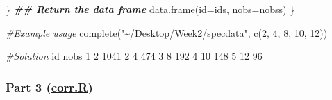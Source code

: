 \documentclass[
]{article}
\newenvironment{Shaded}{\begin{snugshade}}{\end{snugshade}}
\newcommand{\AttributeTok}[1]{\textcolor[rgb]{0.77,0.63,0.00}{#1}}
\newcommand{\CommentTok}[1]{\textcolor[rgb]{0.56,0.35,0.01}{\textit{#1}}}
\newcommand{\DecValTok}[1]{\textcolor[rgb]{0.00,0.00,0.81}{#1}}
\newcommand{\DocumentationTok}[1]{\textcolor[rgb]{0.56,0.35,0.01}{\textbf{\textit{#1}}}}
\newcommand{\FunctionTok}[1]{\textcolor[rgb]{0.00,0.00,0.00}{#1}}
\newcommand{\NormalTok}[1]{#1}
\newcommand{\StringTok}[1]{\textcolor[rgb]{0.31,0.60,0.02}{#1}}
\begin{document}
\begin{Shaded}
\begin{Highlighting}[]
\NormalTok{  \}}
  \DocumentationTok{\#\# Return the data frame}
  \FunctionTok{data.frame}\NormalTok{(}\AttributeTok{id=}\NormalTok{ids, }\AttributeTok{nobs=}\NormalTok{nobss)}
\NormalTok{\}}

\CommentTok{\#Example usage}
\FunctionTok{complete}\NormalTok{(}\StringTok{"\textasciitilde{}/Desktop/Week2/specdata"}\NormalTok{, }\FunctionTok{c}\NormalTok{(}\DecValTok{2}\NormalTok{, }\DecValTok{4}\NormalTok{, }\DecValTok{8}\NormalTok{, }\DecValTok{10}\NormalTok{, }\DecValTok{12}\NormalTok{))}

\CommentTok{\#Solution}
\NormalTok{   id nobs}
 \DecValTok{1}  \DecValTok{2} \DecValTok{1041}
 \DecValTok{2}  \DecValTok{4}  \DecValTok{474}
 \DecValTok{3}  \DecValTok{8}  \DecValTok{192}
 \DecValTok{4} \DecValTok{10}  \DecValTok{148}
 \DecValTok{5} \DecValTok{12}   \DecValTok{96}
\end{Highlighting}
\end{Shaded}

\hypertarget{part-3-corr.r}{%
\subsubsection{\texorpdfstring{Part 3
(\href{https://github.com/kpnaga08/datasciencecoursera/blob/master/R\%20Programming/Project\textquotesingle{}\%20Assignment/Projects/corr.R}{corr.R})}{Part 3 (corr.R)}}\label{part-3-corr.r}}
\end{document}
